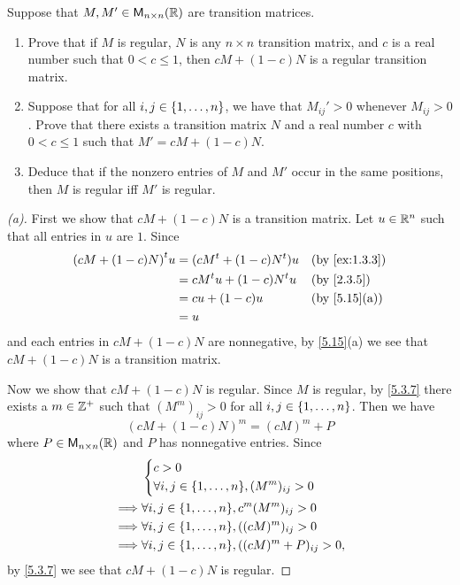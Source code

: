 \setcounter{ex}{18}
\begin{ex}\label{ex:5.3.19}
  Suppose that \(M, M' \in \ms[n][n][\R]\) are transition matrices.
  \begin{enumerate}
    \item Prove that if \(M\) is regular, \(N\) is any \(n \times n\) transition matrix, and \(c\) is a real number such that \(0 < c \leq 1\), then \(cM + (1 - c)N\) is a regular transition matrix.
    \item Suppose that for all \(i, j \in \left\lbrace1, \dots, n\right\rbrace\), we have that \(M_{i j}' > 0\) whenever \(M_{i j} > 0\).
          Prove that there exists a transition matrix \(N\) and a real number \(c\) with \(0 < c \leq 1\) such that \(M' = cM + (1 - c)N\).
    \item Deduce that if the nonzero entries of \(M\) and \(M'\) occur in the same positions, then \(M\) is regular iff \(M'\) is regular.
  \end{enumerate}
\end{ex}

\begin{proof}[(a)]
  First we show that \(cM + (1 - c)N\) is a transition matrix.
  Let \(u \in \mathbb{R}^n\) such that all entries in \(u\) are \(1\).
  Since
  \begin{align*}
    \tp{(cM + (1 - c)N)} u & = (c \tp{M} + (1 - c) \tp{N}) u &  & \by{ex:1.3.3} \\
                           & = c \tp{M} u + (1 - c) \tp{N} u &  & \by{2.3.5}    \\
                           & = c u + (1 - c) u               &  & \by{5.15}[a]  \\
                           & = u
  \end{align*}
  and each entries in \(cM + (1 - c)N\) are nonnegative, by \cref{5.15}(a) we see that \(cM + (1 - c)N\) is a transition matrix.

  Now we show that \(cM + (1 - c)N\) is regular.
  Since \(M\) is regular, by \cref{5.3.7} there exists a \(m \in \mathbb{Z}^+\) such that \((M^m)_{i j} > 0\) for all \(i, j \in \left\lbrace1, \dots, n\right\rbrace\).
  Then we have
  \[
    (cM + (1 - c)N)^m = (cM)^m + P
  \]
  where \(P \in \ms[n][n][\R]\) and \(P\) has nonnegative entries.
  Since
  \begin{align*}
             & \begin{dcases}
                 c > 0 \\
                 \forall i, j \in \set{1, \dots, n}, (M^m)_{i j} > 0
               \end{dcases}          \\
    \implies & \forall i, j \in \set{1, \dots, n}, c^m (M^m)_{i j} > 0     \\
    \implies & \forall i, j \in \set{1, \dots, n}, ((cM)^m)_{i j} > 0      \\
    \implies & \forall i, j \in \set{1, \dots, n}, ((cM)^m + P)_{i j} > 0,
  \end{align*}
  by \cref{5.3.7} we see that \(cM + (1 - c)N\) is regular.
\end{proof}

